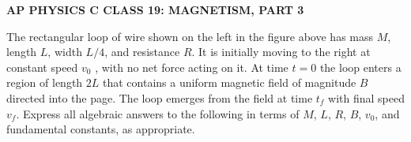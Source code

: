 \documentclass{../../oss-apphys-exam}
\begin{document}
\genheader

\begin{center}
  \textbf{AP PHYSICS C CLASS 19: MAGNETISM, PART 3}
\end{center}
  

\begin{questions}
  \question The rectangular loop of wire shown on the left in the figure above
  has mass $M$, length $L$, width $L/4$, and resistance $R$. It is initially
  moving to the right at constant speed $v_0$ , with no net force acting on
  it. At time $t=0$ the loop enters a region of length $2L$ that contains a
  uniform magnetic field of magnitude $B$ directed into the page. The loop
  emerges from the field at time $t_f$ with final speed $v_f$. Express all
  algebraic answers to the following in terms of $M$, $L$, $R$, $B$, $v_0$,
  and fundamental constants, as appropriate.
\end{questions}
\end{document}
